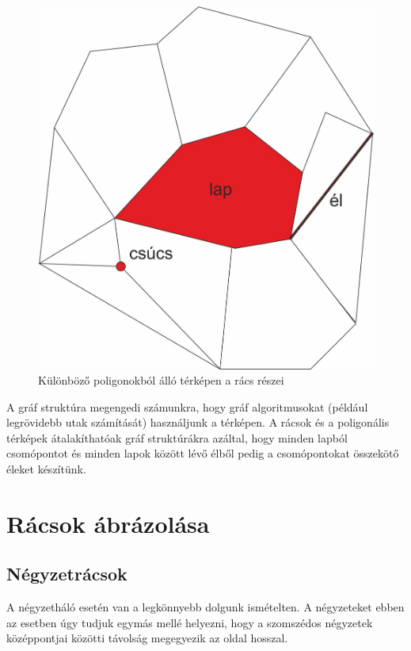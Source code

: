 \begin{figure}[h!]
\centering
\includegraphics[scale=0.4]{kepek/PartsOfGrid2.jpg}
\caption{Különböző poligonokból álló térképen a rács részei}
\label{fig:PartsOfGrid2}
\end{figure}

A gráf struktúra megengedi számunkra, hogy gráf algoritmusokat (például legrövidebb utak számítását) használjunk a térképen. A rácsok és a poligonális térképek átalakíthatóak gráf struktúrákra azáltal, hogy minden lapból csomópontot és minden lapok között lévő élből pedig a csomópontokat összekötő éleket készítünk.

\section{Rácsok ábrázolása}

\subsection{Négyzetrácsok}

A négyzetháló esetén van a legkönnyebb dolgunk ismételten. A négyzeteket ebben az esetben úgy tudjuk egymás mellé helyezni, hogy a szomszédos négyzetek középpontjai közötti távolság megegyezik az oldal hosszal. 

